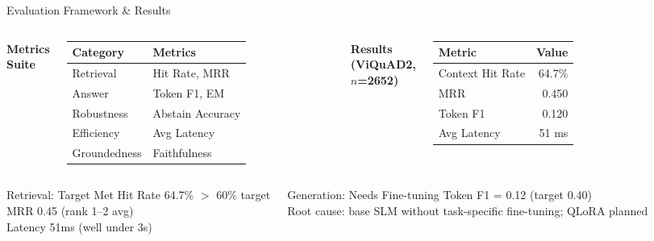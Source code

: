 \documentclass[aspectratio=169]{beamer}
\newcommand{\pos}[1]{\textcolor{positive}{#1}}
\newcommand{\con}[1]{\textcolor{negative}{#1}}
\begin{document}
\begin{frame}{Evaluation Framework \& Results}
\begin{columns}[T]
\textbf{Metrics Suite}
\vspace{4pt}
\begin{tabular}{ll}
\toprule
Category & Metrics \\
\midrule
Retrieval & Hit Rate, MRR \\
Answer & Token F1, EM \\
Robustness & Abstain Accuracy \\
Efficiency & Avg Latency \\
Groundedness & Faithfulness \\
\bottomrule
\end{tabular}

\textbf{Results (ViQuAD2, $n$=2652)}
\vspace{4pt}
\begin{tabular}{lr}
\toprule
Metric & Value \\
\midrule
\pos{Context Hit Rate} & \pos{64.7\%} \\
\pos{MRR} & \pos{0.450} \\
Token F1 & 0.120 \\
Avg Latency & 51 ms \\
\bottomrule
\end{tabular}
\end{columns}
\vspace{0.5em}
\begin{columns}[T]
\begin{exampleblock}{Retrieval: Target Met}
Hit Rate 64.7\% $>$ 60\% target \checkmark\\
MRR 0.45 (rank 1--2 avg) \checkmark\\
Latency 51ms (well under 3s) \checkmark
\end{exampleblock}
\begin{alertblock}{Generation: Needs Fine-tuning}
Token F1 = 0.12 (target 0.40)\\
\con{Root cause:} base SLM without task-specific fine-tuning; QLoRA planned
\end{alertblock}
\end{columns}
\end{frame}
\end{document}
